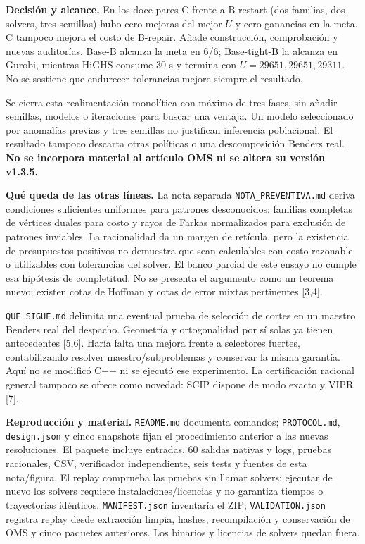 \documentclass[10pt,a4paper]{article}
\begin{document}
\newpage
\textbf{Decisión y alcance.}
En los doce pares C frente a B-restart (dos familias, dos solvers, tres semillas)
hubo cero mejoras del mejor $U$ y cero ganancias en la meta. C tampoco mejora
el costo de B-repair. Añade construcción, comprobación y nuevas auditorías.
Base-B alcanza la meta en 6/6; Base-tight-B la alcanza en Gurobi, mientras
HiGHS consume 30 s y termina con $U=29651,29651,29311$.
No se sostiene que endurecer tolerancias mejore siempre el resultado.

Se cierra esta realimentación monolítica con máximo de tres fases, sin añadir
semillas, modelos o iteraciones para buscar una ventaja. Un modelo seleccionado
por anomalías previas y tres semillas no justifican inferencia poblacional.
El resultado tampoco descarta otras políticas o una descomposición Benders real.
\textbf{No se incorpora material al artículo OMS ni se altera su versión v1.3.5.}

\textbf{Qué queda de las otras líneas.}
La nota separada \texttt{NOTA\_PREVENTIVA.md} deriva condiciones suficientes
uniformes para patrones desconocidos: familias completas de vértices duales
para costo y rayos de Farkas normalizados para exclusión de patrones inviables.
La racionalidad da un margen de retícula, pero la existencia de presupuestos
positivos no demuestra que sean calculables con costo razonable o utilizables
con tolerancias del solver. El banco parcial de este ensayo no cumple esa
hipótesis de completitud. No se presenta el argumento como un teorema nuevo;
existen cotas de Hoffman y cotas de error mixtas pertinentes [3,4].

\texttt{QUE\_SIGUE.md} delimita una eventual prueba de selección de cortes en
un maestro Benders real del despacho. Geometría y ortogonalidad por sí solas
ya tienen antecedentes [5,6]. Haría falta una mejora frente a selectores fuertes,
contabilizando resolver maestro/subproblemas y conservar la misma garantía.
Aquí no se modificó C++ ni se ejecutó ese experimento. La certificación racional
general tampoco se ofrece como novedad: SCIP dispone de modo exacto y VIPR [7].

\textbf{Reproducción y material.}
\texttt{README.md} documenta comandos; \texttt{PROTOCOL.md}, \texttt{design.json}
y cinco snapshots fijan el procedimiento anterior a las nuevas resoluciones.
El paquete incluye entradas, 60 salidas nativas y logs, pruebas racionales,
CSV, verificador independiente, seis tests y fuentes de esta nota/figura.
El replay comprueba las pruebas sin llamar solvers; ejecutar de nuevo los solvers
requiere instalaciones/licencias y no garantiza tiempos o trayectorias idénticos.
\texttt{MANIFEST.json} inventaría el ZIP; \texttt{VALIDATION.json} registra replay
desde extracción limpia, hashes, recompilación y conservación de OMS y cinco
paquetes anteriores. Los binarios y licencias de solvers quedan fuera.
\end{document}

